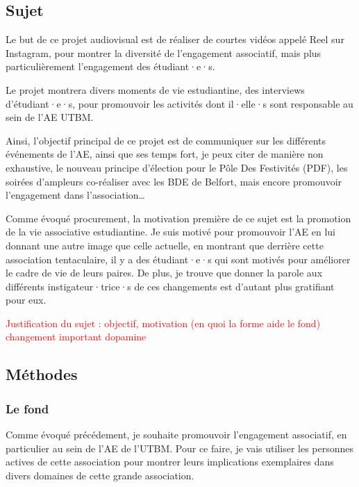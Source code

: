 
\subsection{Sujet}\label{subsec:sujet}

Le but de ce projet audiovisual est de réaliser de courtes vidéos appelé Reel sur Instagram, pour montrer la diversité de l'engagement associatif, mais plus particulièrement l'engagement des étudiant·e·s.

Le projet montrera divers moments de vie estudiantine, des interviews d'étudiant·e·s, pour promouvoir les activités dont il·elle·s sont responsable au sein de l'\gls{AE} \gls{UTBM}.

Ainsi, l'objectif principal de ce projet est de communiquer sur les différents événements de l'\gls{AE}, ainsi que ses temps fort, je peux citer de manière non exhaustive, le nouveau principe d'élection pour le Pôle Des Festivités (PDF), les soirées d'ampleurs co-réaliser avec les BDE de Belfort, mais encore promouvoir l'engagement dans l'association\ldots

Comme évoqué procurement, la motivation première de ce sujet est la promotion de la vie associative estudiantine.
Je suis motivé pour promouvoir l'\gls{AE} en lui donnant une autre image que celle actuelle, en montrant que derrière cette association tentaculaire, il y a des étudiant·e·s qui sont motivés pour améliorer le cadre de vie de leurs paires.
De plus, je trouve que donner la parole aux différents instigateur·trice·s de ces changements est d'autant plus gratifiant pour eux.

\textcolor{red}{Justification du sujet : objectif, motivation (en quoi la forme aide le fond) changement important dopamine}

\subsection{Méthodes}\label{subsec:methodes}

\subsubsection{Le fond}

Comme évoqué précédement, je souhaite promouvoir l'engagement associatif, en particulier au sein de l'\gls{AE} de l'\gls{UTBM}.
Pour ce faire, je vais utiliser les personnes actives de cette association pour montrer leurs implications exemplaires dans divers domaines de cette grande association.

